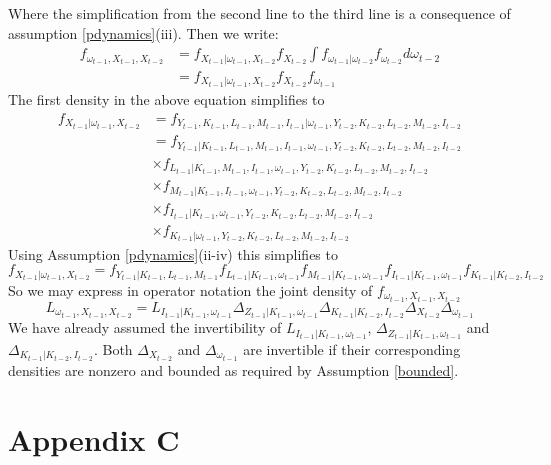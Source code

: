 \documentclass{article}
\begin{document}
Where the simplification from the second line to the third line is a consequence of assumption \eqref{pdynamics}(iii). Then we write:
\begin{equation*}
\begin{split}
f_{\omega_{t-1}, X_{t-1}, X_{t-2}}&=f_{X_{t-1}|\omega_{t-1}, X_{t-2}}f_{X_{t-2}}\int f_{\omega_{t-1}|\omega_{t-2}}f_{\omega_{t-2}}d\omega_{t-2}\\
&=f_{X_{t-1}|\omega_{t-1}, X_{t-2}}f_{X_{t-2}}f_{\omega_{t-1}}
\end{split}
\end{equation*}
The first density in the above equation simplifies to
\begin{equation*}
\begin{split}
f_{X_{t-1}|\omega_{t-1}, X_{t-2}}&=f_{Y_{t-1}, K_{t-1}, L_{t-1}, M_{t-1}, I_{t-1}|\omega_{t-1}, Y_{t-2}, K_{t-2}, L_{t-2}, M_{t-2}, I_{t-2}}\\
&=f_{Y_{t-1}|K_{t-1}, L_{t-1}, M_{t-1}, I_{t-1}, \omega_{t-1}, Y_{t-2}, K_{t-2}, L_{t-2}, M_{t-2}, I_{t-2}}\\
&\times f_{L_{t-1}|K_{t-1}, M_{t-1}, I_{t-1}, \omega_{t-1}, Y_{t-2}, K_{t-2}, L_{t-2}, M_{t-2}, I_{t-2}} \\
& \times f_{M_{t-1}|K_{t-1}, I_{t-1}, \omega_{t-1}, Y_{t-2}, K_{t-2}, L_{t-2}, M_{t-2}, I_{t-2}}\\
&\times f_{I_{t-1}|K_{t-1}, \omega_{t-1}, Y_{t-2}, K_{t-2}, L_{t-2}, M_{t-2}, I_{t-2}}\\
&\times f_{K_{t-1}|\omega_{t-1}, Y_{t-2}, K_{t-2}, L_{t-2}, M_{t-2}, I_{t-2}}
\end{split}
\end{equation*}
Using Assumption \eqref{pdynamics}(ii-iv) this simplifies to
\begin{equation*}
f_{X_{t-1}|\omega_{t-1}, X_{t-2}}=f_{Y_{t-1}|K_{t-1}, L_{t-1}, M_{t-1}}f_{L_{t-1}|K_{t-1}, \omega_{t-1}}f_{M_{t-1}|K_{t-1}, \omega_{t-1}}f_{I_{t-1}|K_{t-1}, \omega_{t-1}}f_{K_{t-1}|K_{t-2}, I_{t-2}}
\end{equation*}
So we may express in operator notation the joint density of $f_{\omega_{t-1}, X_{t-1}, X_{t-2}}$
\begin{equation*}
L_{\omega_{t-1}, X_{t-1}, X_{t-2}}=L_{I_{t-1}|K_{t-1}, \omega_{t-1}}\Delta_{Z_{t-1}|K_{t-1}, \omega_{t-1}}\Delta_{K_{t-1}|K_{t-2}, I_{t-2}}\Delta_{X_{t-2}}\Delta_{\omega_{t-1}}
\end{equation*}
We have already assumed the invertibility of $L_{I_{t-1}|K_{t-1}, \omega_{t-1}}$, $\Delta_{Z_{t-1}|K_{t-1}, \omega_{t-1}}$ and $\Delta_{K_{t-1}|K_{t-2}, I_{t-2}}$. Both $\Delta_{X_{t-2}}$ and $\Delta_{\omega_{t-1}}$ are invertible if their corresponding densities are nonzero and bounded as required by Assumption \eqref{bounded}.

\pagebreak
\newpage
\section*{Appendix C}                                              
\end{document}
